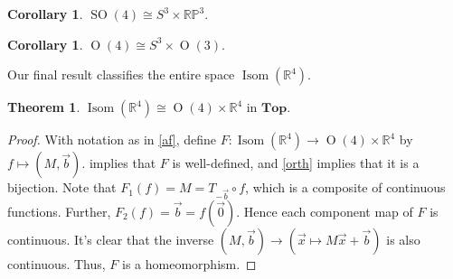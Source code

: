 \documentclass[10pt,letterpaper,cm]{nupset}
\theoremstyle{definition}
\theoremstyle{theorem}
\newtheorem{theorem}[definition]{Theorem}
\newtheorem{cor}[definition]{Corollary}
\theoremstyle{remark}
\newcommand{\RP}{\mathbb {RP}}
\newcommand{\R}{\mathbb R}
\newcommand{\1}{\mathbf{1}}
\renewcommand{\b}{\vec b}
\newcommand{\x}{\vec x}
\newcommand{\0}{\vec {0}}
\DeclareMathOperator{\ORT}{O}
\DeclareMathOperator{\Isom}{Isom}
\DeclareMathOperator{\SO}{SO}
\begin{document}
\begin{cor}
$\SO(4) \cong S^3\times \RP^3$.
\end{cor}

\begin{cor}
$\ORT(4) \cong S^3\times \ORT(3)$.
\end{cor}

\medskip

Our final result  classifies the entire space $\Isom(\R^4)$.

\begin{theorem}
$\Isom(\R^4) \cong \ORT(4)\times \R^4$ in $\mathbf{Top}$. 
\end{theorem}

\begin{proof}
With notation as in \cref{af}, define  $F:\Isom(\R^4)\to \ORT(4)\times \R^4$ by $f\mapsto \left(M, \b\right)$.  implies that $F$ is well-defined, and \cref{orth} implies that it is a bijection. Note that $F_1(f)=M=T_{-\b}\circ f$, which is a composite of continuous functions. Further, $F_2(f)=\b=f(\0)$. Hence each component map of $F$ is continuous. It's clear that the inverse $\left(M,\b\right)\to \left(\x \mapsto M\x +\b\right)$ is also continuous. Thus, $F$ is a homeomorphism.
\end{proof}
\end{document}
